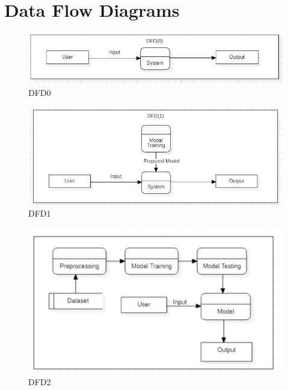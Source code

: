 \documentclass[oneside,a4paper,12pt]{report}
\begin{document}
\section{Data Flow Diagrams}  
\begin{figure}[H]
\begin{center}
\includegraphics[width=1.0\linewidth]{dfd0}
\caption{DFD0}
\label{Fig:f2}
\end{center}
\end{figure}
  
\begin{figure}[H]
\begin{center}
\includegraphics[width=1.0\linewidth]{dfd11}
\caption{DFD1}
\label{Fig:f2}
\end{center}
\end{figure}
  
\begin{figure}[H]
\begin{center}
\includegraphics[width=1.0\linewidth]{dfd2}
\caption{DFD2}
\label{Fig:f2}
\end{center}
\end{figure}
\end{document}
